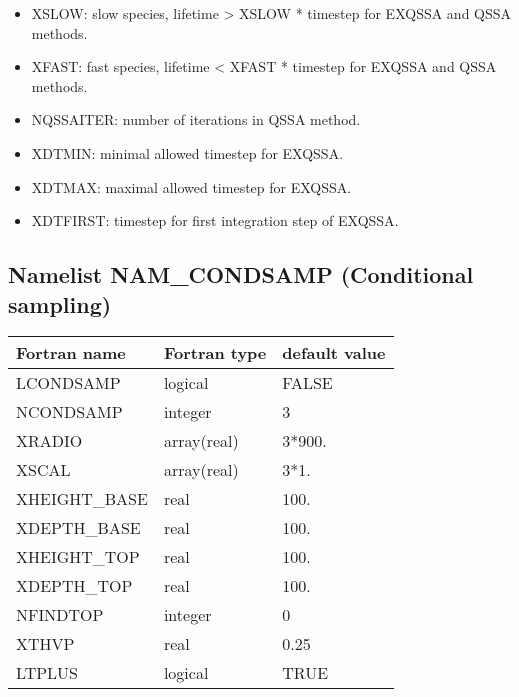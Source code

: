 \begin{itemize}
\item XSLOW: slow species, lifetime > XSLOW * timestep for EXQSSA and QSSA methods.

\item XFAST: fast species, lifetime < XFAST * timestep for EXQSSA and QSSA methods.

\item NQSSAITER: number of iterations in QSSA method.

\item XDTMIN: minimal allowed timestep for EXQSSA.

\item XDTMAX: maximal allowed timestep for EXQSSA.

\item XDTFIRST: timestep for first integration step of EXQSSA.

\end{itemize}
\subsection{Namelist NAM\_CONDSAMP (Conditional sampling)}
\begin{center}
\begin{tabular}{|l|l|l| }
\hline 
 Fortran name  & Fortran type  & default value \\
\hline
 LCONDSAMP     & logical       & FALSE         \\
 NCONDSAMP     & integer       & 3             \\
 XRADIO        & array(real)   & 3*900.     \\
 XSCAL         & array(real)   & 3*1.       \\
 XHEIGHT\_BASE & real          & 100.       \\
 XDEPTH\_BASE  & real          & 100.       \\
 XHEIGHT\_TOP  & real          & 100.       \\
 XDEPTH\_TOP   & real          & 100.       \\
 NFINDTOP      & integer       & 0             \\
 XTHVP         & real          & 0.25       \\
 LTPLUS        & logical       & TRUE         \\

\hline
\end{tabular}
\end{center}


